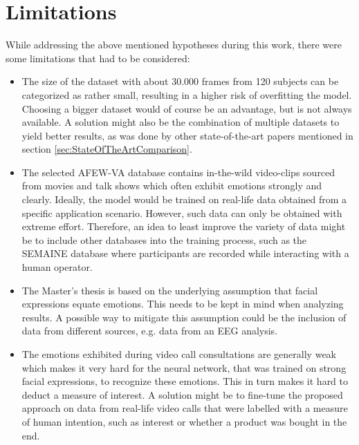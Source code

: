 \section{Limitations}
While addressing the above mentioned hypotheses during this work, there were some limitations that had to be considered:

\begin{itemize}
    \item The size of the dataset with about 30.000 frames from 120 subjects can be categorized as rather small, resulting in a higher risk of overfitting the model. Choosing a bigger dataset would of course be an advantage, but is not always available. A solution might also be the combination of multiple datasets to yield better results, as was done by other state-of-the-art papers mentioned in section \ref{sec:StateOfTheArtComparison}.
    \item The selected AFEW-VA database contains in-the-wild video-clips sourced from movies and talk shows which often exhibit emotions strongly and clearly. Ideally, the model would be trained on real-life data obtained from a specific application scenario. However, such data can only be obtained with extreme effort. Therefore, an idea to least improve the variety of data might be to include other databases into the training process, such as the SEMAINE database where participants are recorded while interacting with a human operator.
    \item The Master's thesis is based on the underlying assumption that facial expressions equate emotions. This needs to be kept in mind when analyzing results. A possible way to mitigate this assumption could be the inclusion of data from different sources, e.g. data from an EEG analysis.
    \item The emotions exhibited during video call consultations are generally weak which makes it very hard for the neural network, that was trained on strong facial expressions, to recognize these emotions. This in turn makes it hard to deduct a measure of interest. A solution might be to fine-tune the proposed approach on data from real-life video calls that were labelled with a measure of human intention, such as interest or whether a product was bought in the end.
\end{itemize}

